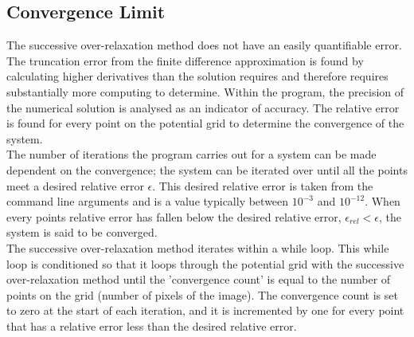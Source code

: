 \subsection{Convergence Limit}
The successive over-relaxation method does not have an easily quantifiable error. The truncation error from the finite difference approximation is found by calculating higher derivatives than the solution requires and therefore requires substantially more computing to determine. Within the program, the precision of the numerical solution is analysed as an indicator of accuracy. The relative error is found for every point on the potential grid to determine the convergence of the system.
\\
The number of iterations the program carries out for a system can be made dependent on the convergence; the system can be iterated over until all the points meet a desired relative error $\epsilon$. This desired relative error is taken from the command line arguments and is a value typically between $10^{-3}$ and $10^{-12}$. When every points relative error has fallen below the desired relative error, $\epsilon_{rel} < \epsilon$, the system is said to be converged. 
\\
The successive over-relaxation method iterates within a while loop. This while loop is conditioned so that it loops through the potential grid with the successive over-relaxation method until the 'convergence count' is equal to the number of points on the grid (number of pixels of the image). The convergence count is set to zero at the start of each iteration, and it is incremented by one for every point that has a relative error less than the desired relative error.

